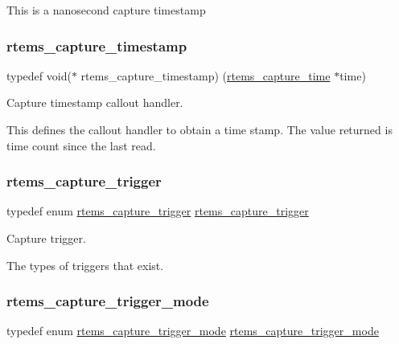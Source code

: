 This is a nanosecond capture timestamp \mbox{\label{group__libmisc__capture_gab70845b819ef4c8c57f4f46ce276f0dd}} 
\subsubsection{\texorpdfstring{rtems\_capture\_timestamp}{rtems\_capture\_timestamp}}
{\footnotesize\ttfamily typedef void($\ast$ rtems\+\_\+capture\+\_\+timestamp) (\mbox{\hyperlink{group__libmisc__capture_gaf4cab587ea286bb2352fcfab9c223560}{rtems\+\_\+capture\+\_\+time}} $\ast$time)}



Capture timestamp callout handler. 

This defines the callout handler to obtain a time stamp. The value returned is time count since the last read. \mbox{\label{group__libmisc__capture_ga12806ba988f2cb7373e289941bedafbf}} 
\subsubsection{\texorpdfstring{rtems\_capture\_trigger}{rtems\_capture\_trigger}}
{\footnotesize\ttfamily typedef enum \mbox{\hyperlink{group__libmisc__capture_ga5fd896f3981ec7db204355a0e527a074}{rtems\+\_\+capture\+\_\+trigger}}  \mbox{\hyperlink{group__libmisc__capture_ga5fd896f3981ec7db204355a0e527a074}{rtems\+\_\+capture\+\_\+trigger}}}



Capture trigger. 

The types of triggers that exist. \mbox{\label{group__libmisc__capture_gadc87e3aa33443ac0b7fb2f3083129eed}} 
\subsubsection{\texorpdfstring{rtems\_capture\_trigger\_mode}{rtems\_capture\_trigger\_mode}}
{\footnotesize\ttfamily typedef enum \mbox{\hyperlink{group__libmisc__capture_ga56557affa8f3021c9d5ed6ebca98f473}{rtems\+\_\+capture\+\_\+trigger\+\_\+mode}}  \mbox{\hyperlink{group__libmisc__capture_ga56557affa8f3021c9d5ed6ebca98f473}{rtems\+\_\+capture\+\_\+trigger\+\_\+mode}}}



